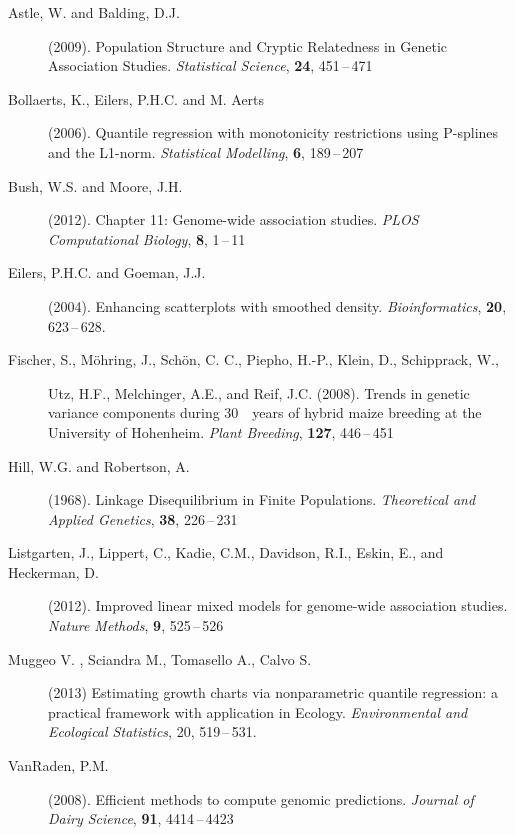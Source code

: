 \documentclass[twoside]{report}
\begin{document}


\begin{description}
\item[Astle, W. and Balding, D.J.] (2009).
		Population Structure and Cryptic Relatedness in Genetic Association Studies.
		{\it Statistical Science}, {\bf 24}, 451\,--\,471
		
\item[Bollaerts, K., Eilers, P.H.C. and M. Aerts] (2006). Quantile regression with monotonicity restrictions using P-splines and the L1-norm. {\it Statistical Modelling}, {\bf 6}, 189\,--\,207 
\item[Bush, W.S. and Moore, J.H.] (2012).
		Chapter 11: Genome-wide association studies.
		{\it PLOS Computational Biology}, {\bf 8}, 1\,--\,11

\item[Eilers, P.H.C. and Goeman, J.J.] (2004).
	Enhancing scatterplots with smoothed density.
	{\it Bioinformatics}, {\bf 20}, 623\,--\,628.

\item[Fischer, S., M\"{o}hring, J., Sch\"{o}n, C. C., Piepho, H.-P., Klein, D., Schipprack, W.,] {Utz, H.F., Melchinger, A.E., and Reif, J.C.} (2008).
		Trends in genetic variance components during 30 years of hybrid maize breeding at the University of Hohenheim.
		{\it Plant Breeding}, {\bf 127}, 446\,--\,451
\item[Hill, W.G. and Robertson, A.] (1968).
		Linkage Disequilibrium in Finite Populations.
		{\it Theoretical and Applied Genetics}, {\bf 38}, 226\,--\,231		
\item[Listgarten, J., Lippert, C., Kadie, C.M., Davidson, R.I., Eskin, E., and Heckerman, D.] (2012). 
		Improved linear mixed models for genome-wide association studies.
		{\it Nature Methods}, {\bf 9}, 525\,--\,526
		
\item [Muggeo V. , Sciandra M., Tomasello A., Calvo S.] (2013) Estimating growth charts via 		
		nonparametric quantile regression: a practical framework with application in Ecology. 
		{\it Environmental and Ecological Statistics}, 20, 519\,--\,531. 		
\item[VanRaden, P.M.] (2008).
		Efficient methods to compute genomic predictions.
		{\it Journal of Dairy Science}, {\bf 91}, 4414\,--\,4423
\end{description}
\end{document}
